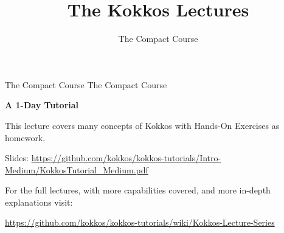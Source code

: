 
\def\sandid{SAND2020-7475 PE}

\title{The Kokkos Lectures}

\author{The Compact Course}




\shorttrue
\mediumtrue
\fullfalse




\begin{frame}
	\titlepage
\end{frame}

\begin{frame}{The Compact Course}
	{\huge The Compact Course}

	\textbf{A 1-Day Tutorial}

	\vspace{10pt}
	This lecture covers many concepts of Kokkos with Hands-On Exercises as homework.

	Slides: \url{https://github.com/kokkos/kokkos-tutorials/Intro-Medium/KokkosTutorial_Medium.pdf}

	\vspace{20pt}
	For the full lectures, with more capabilities covered, and more in-depth explanations visit:

	\url{https://github.com/kokkos/kokkos-tutorials/wiki/Kokkos-Lecture-Series}
\end{frame}



